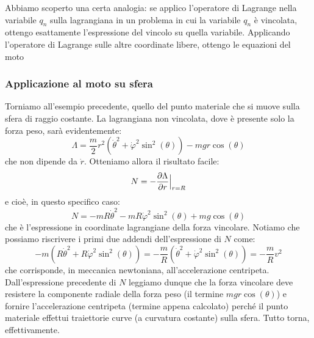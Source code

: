 \documentclass[a4paper,openany]{article}
\begin{document}
	
	Abbiamo scoperto una certa analogia: se applico l'operatore di Lagrange nella variabile $q_n$ sulla lagrangiana in un problema in cui la variabile $q_n$ è vincolata, ottengo esattamente l'espressione del vincolo su quella variabile. Applicando l'operatore di Lagrange sulle altre coordinate libere, ottengo le equazioni del moto
	\subsubsection{Applicazione al moto su sfera}
	Torniamo all'esempio precedente, quello del punto materiale che si muove sulla sfera di raggio costante.
	La lagrangiana non vincolata, dove è presente solo la forza peso, sarà evidentemente:
	$$
	\Lambda = \dfrac{m}{2}r^{2}(\dot{\theta}^{2}+\dot{\varphi}^{2}\sin^{2}(\theta)) - mgr\cos(\theta)
	$$
	che non dipende da $\dot{r}$. Otteniamo allora il risultato facile:
	$$
	N = - \dfrac{\partial \Lambda}{\partial r}\Bigl|_{r=R}
	$$
	e cioè, in questo specifico caso:
	$$
	N = -mR\dot{\theta}^{2}-mR\dot{\varphi}^{2}\sin^{2}(\theta) + mg\cos(\theta)
	$$
	che è l'espressione in coordinate lagrangiane della forza vincolare. Notiamo che possiamo riscrivere i primi due addendi dell'espressione di $N$ come:
	$$ -m(R\dot{\theta}^{2}+R\dot{\varphi}^{2}\sin^{2}(\theta))  = -\dfrac{m}{R}(\dot{\theta}^{2}+ \dot{\varphi}^{2}\sin^{2}(\theta)) = -\dfrac{m}{R}v^{2}
	$$
	che corrisponde, in meccanica newtoniana, all'accelerazione centripeta. Dall'espressione precedente di $N$ leggiamo dunque che la forza vincolare deve resistere la componente radiale della forza peso (il termine $mgr\cos(\theta)$) e fornire l'accelerazione centripeta (termine appena calcolato) perché il punto materiale effettui traiettorie curve (a curvatura costante) sulla sfera. Tutto torna, effettivamente.
	
\end{document}
